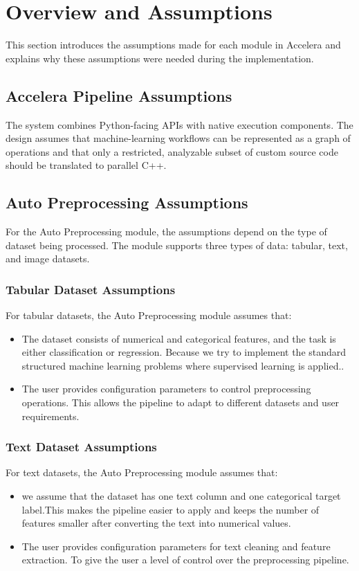 \documentclass[12pt,a4paper]{report}
\begin{document}
\section{Overview and Assumptions}
This section introduces the assumptions made for each module in Accelera and
explains why these assumptions were needed during the implementation.
\subsection{Accelera Pipeline Assumptions}
The system combines Python-facing APIs with native execution components. The
design assumes that machine-learning workflows can be represented as a graph
of operations and that only a restricted, analyzable subset of custom source
code should be translated to parallel C++.
\subsection{Auto Preprocessing Assumptions}

For the Auto Preprocessing module, the assumptions depend on the type of dataset being processed. The module supports three types of data: tabular, text, and image datasets.

\subsubsection{Tabular Dataset Assumptions}

For tabular datasets, the Auto Preprocessing module assumes that:

\begin{itemize}
\item The dataset consists of numerical and categorical features, and the task is either classification or regression.  
Because we try to implement the standard structured machine learning problems where supervised learning is applied..
\item The user provides configuration parameters to control preprocessing operations.  
This allows the pipeline to adapt to different datasets and user requirements.
\end{itemize}
\subsubsection{Text Dataset Assumptions}

For text datasets, the Auto Preprocessing module assumes that:

\begin{itemize}
\item we assume that the dataset has one text column and one categorical target label.This makes the pipeline easier to apply and keeps the number of features smaller after converting the text into numerical values.
\item The user provides configuration parameters for text cleaning and feature extraction.  
To give the user a level of control over the preprocessing pipeline.
\end{itemize}
\end{document}
